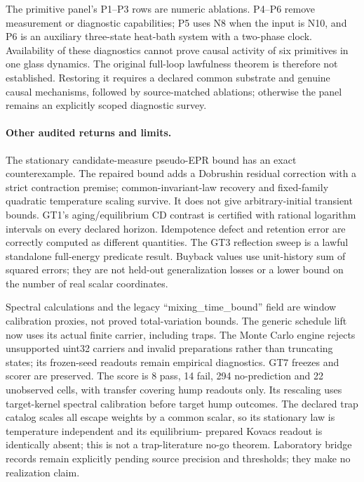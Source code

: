 \documentclass{article}
\begin{document}
The primitive panel's P1--P3 rows are numeric ablations. P4--P6 remove
measurement or diagnostic capabilities; P5 uses N8 when the input is N10,
and P6 is an auxiliary three-state heat-bath system with a two-phase clock.
Availability of these diagnostics cannot prove causal activity of six
primitives in one glass dynamics. The original full-loop lawfulness theorem
is therefore not established. Restoring it requires a declared common
substrate and genuine causal mechanisms, followed by source-matched ablations;
otherwise the panel remains an explicitly scoped diagnostic survey.

\paragraph{Other audited returns and limits.}
The stationary candidate-measure pseudo-EPR bound has an exact counterexample.
The repaired bound adds a Dobrushin residual correction with a strict
contraction premise; common-invariant-law recovery and fixed-family quadratic
temperature scaling survive. It does not give arbitrary-initial transient
bounds. GT1's aging/equilibrium CD contrast is certified with rational logarithm
intervals on every declared horizon. Idempotence defect and retention error
are correctly computed as different quantities. The GT3 reflection sweep
is a lawful standalone full-energy predicate result. Buyback values use
unit-history sum of squared errors; they are not held-out generalization
losses or a lower bound on the number of real scalar coordinates.

Spectral calculations and the legacy ``mixing\_time\_bound'' field are window
calibration proxies, not proved total-variation bounds. The generic schedule
lift now uses its actual finite carrier, including traps. The Monte Carlo
engine rejects unsupported uint32 carriers and invalid preparations rather
than truncating states; its frozen-seed readouts remain empirical diagnostics.
GT7 freezes and scorer are preserved. The score is 8 pass, 14 fail,
294 no-prediction and 22 unobserved cells, with transfer covering hump readouts
only. Its rescaling uses target-kernel spectral calibration before target
hump outcomes. The declared trap catalog scales all escape weights by a common
scalar, so its stationary law is temperature independent and its equilibrium-
prepared Kovacs readout is identically absent; this is not a trap-literature
no-go theorem. Laboratory bridge records remain explicitly pending source
precision and thresholds; they make no realization claim.
\end{document}
